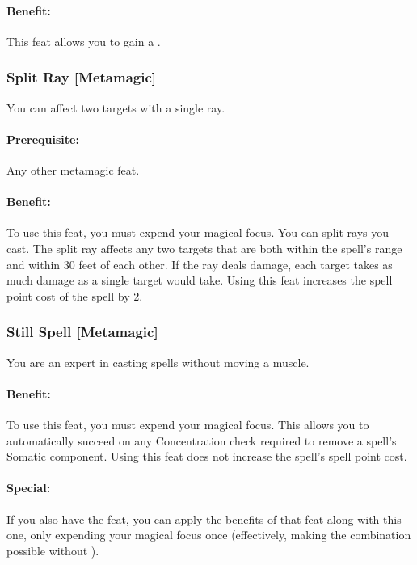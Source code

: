 \paragraph{Benefit:} This feat allows you to gain a . 

\subsubsection[Split Ray]{Split Ray [Metamagic]}
\label{Feat:SplitRay}
You can affect two targets with a single ray.

\paragraph{Prerequisite:} Any other metamagic feat.

\paragraph{Benefit:} To use this feat, you must expend your magical focus. You can split rays you cast. 
The split ray affects any two targets that are both within the spell's range and within 30 feet of each other. 
If the ray deals damage, each target takes as much damage as a single target would take.
Using this feat increases the spell point cost of the spell by 2.

\subsubsection[Still Spell]{Still Spell [Metamagic]}
\label{Feat:StillSpell}
You are an expert in casting spells without moving a muscle.

\paragraph{Benefit:} To use this feat, you must expend your magical focus.
This allows you to automatically succeed on any Concentration check required to remove a spell's Somatic component.
Using this feat does not increase the spell's spell point cost.

\paragraph{Special:} If you also have the  feat, you can apply the benefits of that feat along with this one, only expending your magical focus once 
(effectively, making the combination possible without ).
